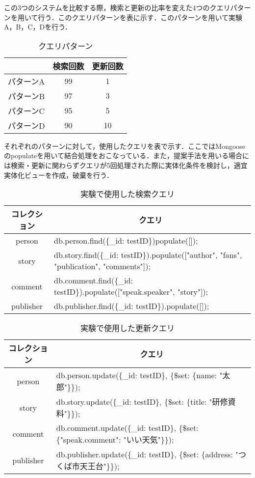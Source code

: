 \documentclass[a4paper,11pt]{ujreport}
\begin{document}
この3つのシステムを比較する際，検索と更新の比率を変えた4つのクエリパターンを用いて行う．このクエリパターンを表に示す．このパターンを用いて実験A，B，C，Dを行う．
\begin{table}[htb]
  \begin{center}
    \caption{クエリパターン}
		\label{table:experiment_query_pattern}
    \begin{tabular}{|c|c|c|} \hline
        & 検索回数 & 更新回数 \\ \hline
      パターンA & 99 & 1\\ \hline
      パターンB & 97 & 3\\ \hline
			パターンC & 95 & 5\\ \hline
      パターンD & 90 & 10\\ \hline
    \end{tabular}
  \end{center}
\end{table}
それぞれのパターンに対して，使用したクエリを表で示す．ここではMongooseのpopulateを用いて結合処理をおこなっている．また，提案手法を用いる場合には検索・更新に関わらずクエリが5回処理された際に実体化条件を検討し，適宜実体化ビューを作成，破棄を行う．
\begin{table}[htb]
  \begin{center}
    \caption{実験で使用した検索クエリ}
		\label{table:ExperimentFindQuery}
    \begin{tabular}{|c|l|} \hline
      コレクション & \multicolumn{1}{|c|}{クエリ}\\ \hline
      person & db.person.find(\{\_id: testID\})populate([]);\\ \hline
			story & db.story.find(\{\_id: testID\}).populate(["author", "fans", "publication", "comments"]);\\ \hline
      comment & db.comment.find(\{\_id: testID\}).populate(["speak.speaker", "story"]);\\ \hline
      publisher & db.publisher.find(\{\_id: testID\}).populate([]);\\ \hline
    \end{tabular}
  \end{center}
\end{table}
\begin{table}[htb]
  \begin{center}
    \caption{実験で使用した更新クエリ}
		\label{table:ExperimentUpdateQuery}
    \begin{tabular}{|c|l|} \hline
      コレクション & \multicolumn{1}{|c|}{クエリ}\\ \hline
      person & db.person.update(\{\_id: testID\}, \{\$set: \{name: "太郎"\}\});\\ \hline
			story & db.story.update(\{\_id: testID\}, \{\$set: \{title: "研修資料"\}\});\\ \hline
      comment & db.comment.update(\{\_id: testID\}, \{\$set: \{"speak.comment": "いい天気"\}\});\\ \hline
      publisher & db.publisher.update(\{\_id: testID\}, \{\$set: \{address: "つくば市天王台"\}\});\\ \hline
    \end{tabular}
  \end{center}
\end{table}
\end{document}

